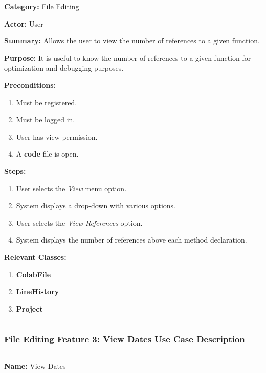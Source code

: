 \documentclass[twoside,letterpaper]{article}
\begin{document}
		\noindent\textbf{Category:} File Editing \newline
		
		\noindent\textbf{Actor:} User \newline
		
		\noindent\textbf{Summary:} Allows the user to view the number of references to a given function. \newline
		
		\noindent\textbf{Purpose:} It is useful to know the number of references to a given function for optimization and debugging purposes. \newline
		
		\noindent\textbf{Preconditions:}
		\begin{enumerate}
			\item Must be registered.
			\item Must be logged in.
			\item User has view permission.
			\item A \textbf{code} file is open.
		\end{enumerate}
		\noindent\textbf{Steps:}
		\begin{enumerate}
			\item User selects the \textit{View} menu option.
			\item System displays a drop-down with various options.
			\item User selects the \textit{View References} option.
			\item System displays the number of references above each method declaration.
		\end{enumerate}
		\noindent\textbf{Relevant Classes:}
		\begin{enumerate}
			\item \textbf {ColabFile}
			\item \textbf {LineHistory}
			\item \textbf {Project}
		\end{enumerate}
	\vspace{8pt}
	\hrule
	\newpage
	
	\subsubsection[File Editing Feature 3: View Dates]{\rmfamily\bfseries\color{black}
		File Editing Feature 3: View Dates Use Case Description}
	\hypertarget{RefHeading22059017292}{}
	
	\vspace{2pt}
	\hrule
	\vspace{8pt}
		\noindent\textbf{Name:} View Dates \newline
		
\end{document}
